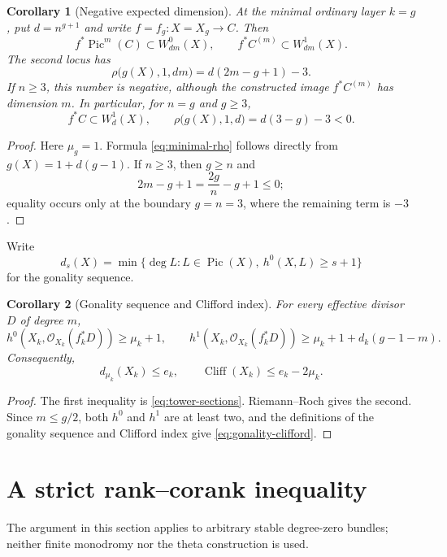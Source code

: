 \documentclass[11pt,reqno]{amsart}
\numberwithin{equation}{section}
\newtheorem{corollary}[corollary]{Corollary}
\theoremstyle{remark}
\DeclareMathOperator{\Pic}{Pic}
\DeclareMathOperator{\Cliff}{Cliff}
\newcommand{\cO}{\mathcal O}
\begin{document}
\begin{corollary}[Negative expected dimension]\label{cor:negative-BN}
At the minimal ordinary layer \(k=g\), put \(d=n^{g+1}\) and write
\(f=f_g\colon X=X_g\to C\).  Then
\[
 f^*\Pic^m(C)\subset W_{dm}^0(X),\qquad
 f^*C^{(m)}\subset W_{dm}^1(X).
\tag{5.7}\label{eq:minimal-BN}
\]
The second locus has
\[
 \rho\bigl(g(X),1,dm\bigr)=d(2m-g+1)-3.
\tag{5.8}\label{eq:minimal-rho}
\]
If \(n\geq3\), this number is negative, although the constructed image
\(f^*C^{(m)}\) has dimension \(m\).  In particular, for \(n=g\)
and \(g\geq3\),
\[
 f^*C\subset W_d^1(X),\qquad
 \rho\bigl(g(X),1,d\bigr)=d(3-g)-3<0.
\tag{5.9}\label{eq:Prill-negative-rho}
\]
\end{corollary}

\begin{proof}
Here \(\mu_g=1\).  Formula \eqref{eq:minimal-rho} follows directly from
\(g(X)=1+d(g-1)\).  If \(n\geq3\), then \(g\geq n\) and
\[
 2m-g+1=\frac{2g}{n}-g+1\leq0;
\]
equality occurs only at the boundary \(g=n=3\), where the remaining
term is \(-3\).
\end{proof}

Write
\[
 d_s(X)=\min\{\deg L:L\in\Pic(X),\ h^0(X,L)\geq s+1\}
\]
for the gonality sequence.

\begin{corollary}[Gonality sequence and Clifford index]\label{cor:clifford-tower}
For every effective divisor \(D\) of degree \(m\),
\[
 h^0(X_k,\cO_{X_k}(f_k^*D))\geq\mu_k+1,\qquad
 h^1(X_k,\cO_{X_k}(f_k^*D))
 \geq\mu_k+1+d_k(g-1-m).
\tag{5.10}\label{eq:special-pullback}
\]
Consequently,
\[
 d_{\mu_k}(X_k)\leq e_k,\qquad
 \Cliff(X_k)\leq e_k-2\mu_k.
\tag{5.11}\label{eq:gonality-clifford}
\]
\end{corollary}

\begin{proof}
The first inequality is \eqref{eq:tower-sections}.  Riemann--Roch gives
the second.  Since \(m\leq g/2\), both \(h^0\) and \(h^1\) are at least
two, and the definitions of the gonality sequence and Clifford index
give \eqref{eq:gonality-clifford}.
\end{proof}

\section{A strict rank--corank inequality}

The argument in this section applies to arbitrary stable degree-zero
bundles; neither finite monodromy nor the theta construction is used.
\end{document}
